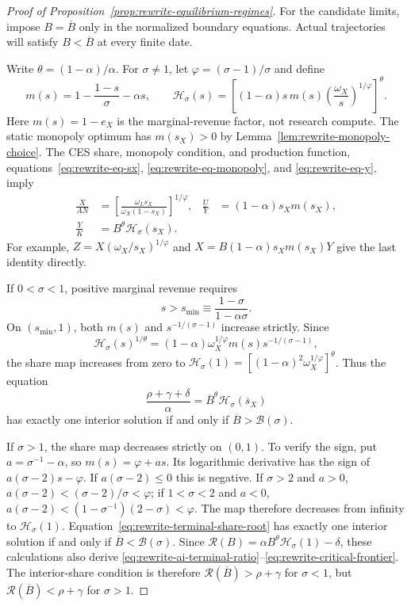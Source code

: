 \begin{proof}[Proof of Proposition~\ref{prop:rewrite-equilibrium-regimes}]
For the candidate limits, impose $B=\overline B$ only in the normalized
boundary equations. Actual trajectories will satisfy $B<\overline B$
at every finite date.


Write $\theta=(1-\alpha)/\alpha$. For $\sigma\ne1$, let
$\varphi=(\sigma-1)/\sigma$ and define
\[
 m(s)=1-\frac{1-s}{\sigma}-\alpha s,\qquad
 \mathcal H_\sigma(s)=
 \left[(1-\alpha)s\,m(s)
       \left(\frac{\omega_X}{s}\right)^{1/\varphi}\right]^\theta.
\]
Here $m(s)=1-e_X$ is the marginal-revenue factor, not research compute.
The static monopoly optimum has $m(s_X)>0$ by
Lemma~\ref{lem:rewrite-monopoly-choice}. The CES share, monopoly condition,
and production function, equations~\eqref{eq:rewrite-eq-sx},
\eqref{eq:rewrite-eq-monopoly}, and \eqref{eq:rewrite-eq-y}, imply
\begin{align}
 \frac{X}{AN}
 &=\left[\frac{\omega_Ls_X}{\omega_X(1-s_X)}\right]^{1/\varphi},
 &
 \frac{U}{Y}&=(1-\alpha)s_Xm(s_X), \label{eq:rewrite-frontier-static-shares}\\
 \frac{Y}{K}&=B^\theta\mathcal H_\sigma(s_X).
 \label{eq:rewrite-frontier-share-map}
\end{align}
For example, $Z=X(\omega_X/s_X)^{1/\varphi}$ and
$X=B(1-\alpha)s_Xm(s_X)Y$ give the last identity directly.

If $0<\sigma<1$, positive marginal revenue requires
\[
 s>s_{\min}\equiv\frac{1-\sigma}{1-\alpha\sigma}.
\]
On $(s_{\min},1)$, both $m(s)$ and $s^{-1/(\sigma-1)}$ increase strictly.
Since
\[
 \mathcal H_\sigma(s)^{1/\theta}
 =(1-\alpha)\omega_X^{1/\varphi}
 m(s)s^{-1/(\sigma-1)},
\]
the share map increases from zero to
$\mathcal H_\sigma(1)=[(1-\alpha)^2\omega_X^{1/\varphi}]^\theta$.
Thus the equation
\begin{equation}
 \frac{\rho+\gamma+\delta}{\alpha}
 =\overline B^\theta\mathcal H_\sigma(\overline s_X)
 \label{eq:rewrite-terminal-share-root}
\end{equation}
has exactly one interior solution if and only if
$\overline B>\mathcal B(\sigma)$.

If $\sigma>1$, the share map decreases strictly on $(0,1)$.
To verify the sign, put $a=\sigma^{-1}-\alpha$, so $m(s)=\varphi+as$.
Its logarithmic derivative has the sign of $a(\sigma-2)s-\varphi$.
If $a(\sigma-2)\leq0$ this is negative. If $\sigma>2$ and $a>0$,
$a(\sigma-2)<(\sigma-2)/\sigma<\varphi$; if $1<\sigma<2$ and $a<0$,
$a(\sigma-2)<(1-\sigma^{-1})(2-\sigma)<\varphi$.
The map therefore decreases from infinity to $\mathcal H_\sigma(1)$.
Equation~\eqref{eq:rewrite-terminal-share-root} has exactly one interior
solution if and only if $\overline B<\mathcal B(\sigma)$.
Since $\mathcal R(B)=\alpha B^\theta\mathcal H_\sigma(1)-\delta$,
these calculations also derive
\eqref{eq:rewrite-ai-terminal-ratio}--\eqref{eq:rewrite-critical-frontier}.
The interior-share condition is therefore
$\mathcal R(\overline B)>\rho+\gamma$ for $\sigma<1$, but
$\mathcal R(\overline B)<\rho+\gamma$ for $\sigma>1$.


\end{proof}
